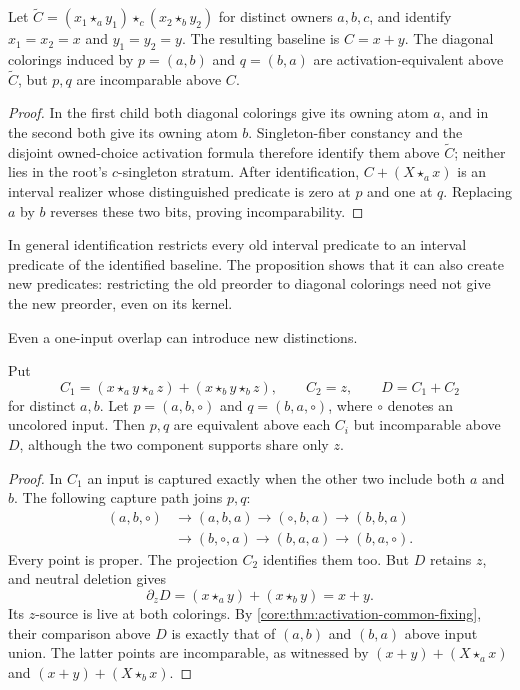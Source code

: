 \begin{proposition}
\label{core:prop:activation-diagonal-splitting}
Let $\widetilde C=(x_1\star_a y_1)\star_c(x_2\star_b y_2)$
for distinct owners $a,b,c$, and identify $x_1=x_2=x$ and $y_1=y_2=y$.
The resulting baseline is $C=x+y$. The diagonal colorings induced by
$p=(a,b)$ and $q=(b,a)$ are activation-equivalent above
$\widetilde C$, but $p,q$ are incomparable above $C$.
\end{proposition}
\begin{proof}
In the first child both diagonal colorings give its owning atom $a$,
and in the second both give its owning atom $b$. Singleton-fiber
constancy and the disjoint owned-choice activation formula therefore
identify them above $\widetilde C$; neither lies in the root's
$c$-singleton stratum.
After identification, $C+(X\star_a x)$ is an interval realizer whose
distinguished predicate is zero at $p$ and one at $q$. Replacing
$a$ by $b$ reverses these two bits, proving incomparability.
\end{proof}

In general identification restricts every old interval predicate to
an interval predicate of the identified baseline. The proposition shows
that it can also create new predicates: restricting the old preorder
to diagonal colorings need not give the new preorder, even on its kernel.

Even a one-input overlap can introduce new distinctions.

\begin{proposition}
\label{core:prop:activation-shared-buffer}
Put
\[
 C_1=(x\star_a y\star_a z)+(x\star_b y\star_b z),
 \qquad C_2=z,\qquad D=C_1+C_2
\]
for distinct $a,b$. Let $p=(a,b,\circ)$ and $q=(b,a,\circ)$,
where $\circ$ denotes an uncolored input. Then $p,q$ are equivalent
above each $C_i$ but incomparable above $D$, although the two
component supports share only $z$.
\end{proposition}
\begin{proof}
In $C_1$ an input is captured exactly when the other two include
both $a$ and $b$. The following capture path joins $p,q$:
\[
 \begin{aligned}
 (a,b,\circ)&\longrightarrow(a,b,a)\longrightarrow(\circ,b,a)
 \longrightarrow(b,b,a)\\
 &\longrightarrow(b,\circ,a)\longrightarrow(b,a,a)
 \longrightarrow(b,a,\circ).
 \end{aligned}
\]
Every point is proper. The projection $C_2$ identifies them too.
But $D$ retains $z$, and neutral deletion gives
\[
 \partial_zD=(x\star_a y)+(x\star_b y)=x+y.
\]
Its $z$-source is live at both colorings. By
\cref{core:thm:activation-common-fixing}, their comparison above
$D$ is exactly that of $(a,b)$ and $(b,a)$ above input union.
The latter points are incomparable, as witnessed by
$(x+y)+(X\star_a x)$ and $(x+y)+(X\star_b x)$.
\end{proof}

